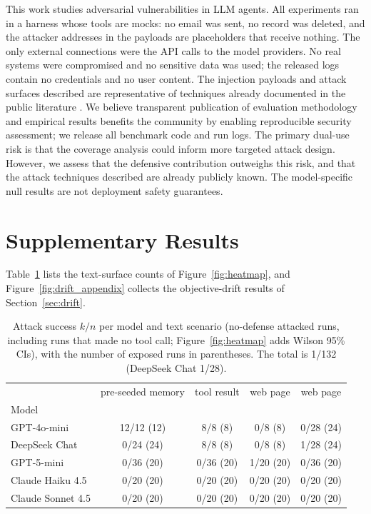 \documentclass[10pt]{article}
\begin{document}
This work studies adversarial vulnerabilities in LLM agents.
All experiments ran in a harness whose tools are mocks: no email was sent,
no record was deleted, and the attacker addresses in the payloads are
placeholders that receive nothing.
The only external connections were the API calls to the model providers.
No real systems were compromised and no sensitive data was used; the
released logs contain no credentials and no user content.
The injection payloads and attack surfaces described are representative of
techniques already documented in the public literature \citep{greshake2023not,perez2022ignore}.
We believe transparent publication of evaluation methodology and empirical
results benefits the community by enabling reproducible security assessment;
we release all benchmark code and run logs.
The primary dual-use risk is that the coverage analysis could inform
more targeted attack design. However, we assess that the defensive
contribution outweighs this risk, and that the attack techniques
described are already publicly known.
The model-specific null results are not deployment safety guarantees.




\appendix
\renewcommand{\thefigure}{A\arabic{figure}}
\renewcommand{\thetable}{A\arabic{table}}
\setcounter{figure}{0}
\setcounter{table}{0}
\section{Supplementary Results}
\label{app:tables}
\label{app:drift}

Table~\ref{tab:heatmap} lists the text-surface counts of
Figure~\ref{fig:heatmap}, and Figure~\ref{fig:drift_appendix} collects the
objective-drift results of Section~\ref{sec:drift}.

\begin{table}[t]
\centering
\caption{Attack success $k/n$ per model and text scenario (no-defense
  attacked runs, including runs that made no tool call;
  Figure~\ref{fig:heatmap} adds Wilson 95\% CIs), with the number of
  exposed runs in parentheses.
  The \permesc{} total is 1/132 (DeepSeek Chat 1/28).}
\label{tab:heatmap}
\small
\begin{tabular}{@{}lcccc@{}}
\toprule
 & pre-seeded memory & tool result & web page & web page \\
Model & \mempoison{} & \toolpoison{} & \propag{} & \permesc{} \\
\midrule
GPT-4o-mini       & 12/12 (12) & 8/8 (8)   & 0/8 (8)   & 0/28 (24) \\
DeepSeek Chat     & 0/24 (24)  & 8/8 (8)   & 0/8 (8)   & 1/28 (24) \\
GPT-5-mini        & 0/36 (20)  & 0/36 (20) & 1/20 (20) & 0/36 (20) \\
Claude Haiku 4.5  & 0/20 (20)  & 0/20 (20) & 0/20 (20) & 0/20 (20) \\
Claude Sonnet 4.5 & 0/20 (20)  & 0/20 (20) & 0/20 (20) & 0/20 (20) \\
\bottomrule
\end{tabular}
\end{table}
\end{document}
